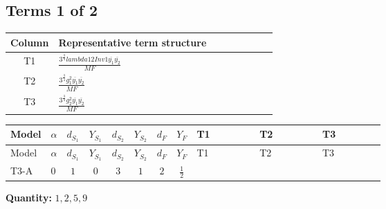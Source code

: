 \documentclass[8pt]{article}
\begin{document}
\begin{landscape}
\subsection*{Terms 1 of 2}
\begin{center}
\begin{tabular}{@{}c >{\raggedright\arraybackslash}p{0.82\linewidth}@{}}
\toprule
Column & Representative term structure \\
\midrule
T1 & \(\displaystyle \frac{3^{\frac{3}{4}} lambda12Inv1 \overline{y_{1}} \overline{y_{2}}}{MF}\) \\
\midrule
T2 & \(\displaystyle \frac{3^{\frac{3}{4}} g_{1}^{2} \overline{y_{1}} \overline{y_{2}}}{MF}\) \\
\midrule
T3 & \(\displaystyle \frac{3^{\frac{3}{4}} g_{2}^{2} \overline{y_{1}} \overline{y_{2}}}{MF}\) \\
\midrule
\bottomrule
\end{tabular}
\end{center}
\smallskip
\tiny
\begin{longtable}{@{}llcccccc >{\raggedright\arraybackslash}p{0.21\linewidth} >{\raggedright\arraybackslash}p{0.21\linewidth} >{\raggedright\arraybackslash}p{0.21\linewidth}@{}}
\toprule
Model & $\alpha$ & $d_{S_1}$ & $Y_{S_1}$ & $d_{S_2}$ & $Y_{S_2}$ & $d_F$ & $Y_F$ & T1 & T2 & T3 \\
\midrule
\endfirsthead
\toprule
Model & $\alpha$ & $d_{S_1}$ & $Y_{S_1}$ & $d_{S_2}$ & $Y_{S_2}$ & $d_F$ & $Y_F$ & T1 & T2 & T3 \\
\midrule
\endhead
T3-A & $0$ & $1$ & $0$ & $3$ & $1$ & $2$ & $\frac{1}{2}$ & \scriptsize\adjustbox{max width=\linewidth}{$\begin{gathered} \frac{3^{\frac{3}{4}} lambda12Inv1 \overline{y_{1}} \overline{y_{2}}}{6 MF}\end{gathered}$} & \scriptsize\adjustbox{max width=\linewidth}{$\begin{gathered} \frac{3^{\frac{3}{4}} g_{1}^{2} \overline{y_{1}} \overline{y_{2}}}{8 MF}\end{gathered}$} & \scriptsize\adjustbox{max width=\linewidth}{$\begin{gathered} \frac{25 \cdot 3^{\frac{3}{4}} g_{2}^{2} \overline{y_{1}} \overline{y_{2}}}{24 MF}\end{gathered}$} \\
\midrule
\bottomrule
\end{longtable}
\clearpage
\noindent\textbf{Quantity: }$\mathrm{1,2,5,9}$\par\smallskip

\end{landscape}
\end{document}
